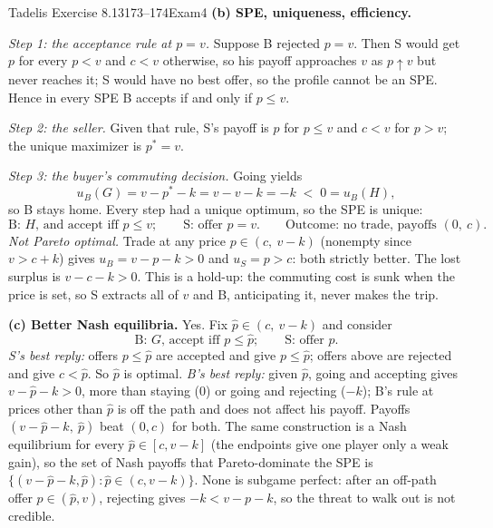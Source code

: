 \begin{exsol}{Tadelis Exercise 8.13}{173--174}{Exam}{4}
\textbf{(b) SPE, uniqueness, efficiency.}

\emph{Step 1: the acceptance rule at $p = v$.} Suppose B rejected $p = v$. Then S would get $p$
for every $p < v$ and $c < v$ otherwise, so his payoff approaches $v$ as $p \uparrow v$ but never
reaches it; S would have no best offer, so the profile cannot be an SPE. Hence in every SPE B
accepts if and only if $p \le v$.

\emph{Step 2: the seller.} Given that rule, S's payoff is $p$ for $p \le v$ and $c < v$ for
$p > v$; the unique maximizer is $p^* = v$.

\emph{Step 3: the buyer's commuting decision.} Going yields
\[
  u_B(G) = v - p^* - k = v - v - k = -k \;<\; 0 = u_B(H),
\]
so B stays home. Every step had a unique optimum, so the SPE is unique:
\[
  \text{B: } H\text{, and accept iff } p \le v;\qquad \text{S: offer } p = v. \qquad
  \text{Outcome: no trade, payoffs } (0,\ c).
\]
\emph{Not Pareto optimal.} Trade at any price $p \in (c,\ v - k)$ (nonempty since $v > c+k$)
gives $u_B = v - p - k > 0$ and $u_S = p > c$: both strictly better. The lost surplus is
$v - c - k > 0$. This is a hold-up: the commuting cost is sunk when the price is set, so S
extracts all of $v$ and B, anticipating it, never makes the trip.

\textbf{(c) Better Nash equilibria.} Yes. Fix $\hat p \in (c,\ v - k)$ and consider
\[
  \text{B: } G\text{, accept iff } p \le \hat p;\qquad \text{S: offer } \hat p .
\]
\emph{S's best reply:} offers $p \le \hat p$ are accepted and give $p \le \hat p$; offers above are
rejected and give $c < \hat p$. So $\hat p$ is optimal. \emph{B's best reply:} given $\hat p$,
going and accepting gives $v - \hat p - k > 0$, more than staying (0) or going and rejecting
($-k$); B's rule at prices other than $\hat p$ is off the path and does not affect his payoff.
Payoffs $(v - \hat p - k,\ \hat p)$ beat $(0, c)$ for both. The same construction is a Nash
equilibrium for every $\hat p \in [c, v - k]$ (the endpoints give one player only a weak gain), so
the set of Nash payoffs that Pareto-dominate the SPE is $\{(v - \hat p - k, \hat p) : \hat p \in (c,
v-k)\}$. None is subgame perfect: after an off-path offer $p \in (\hat p, v)$, rejecting gives
$-k < v - p - k$, so the threat to walk out is not credible.


\end{exsol}
